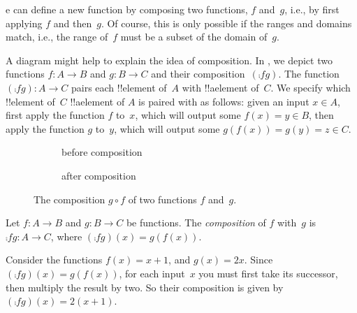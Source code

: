 \documentclass[../../../include/open-logic-section]{subfiles}
\begin{document}

\begin{explain}
e can define a new
function by composing two functions, $f$ and~$g$, i.e., by first
applying $f$ and then~$g$. Of course, this is only possible if the
ranges and domains match, i.e., the range of~$f$ must be a subset of
the domain of~$g$. 

A diagram might help to explain the idea of composition. In
, we depict two functions $f \colon A \to B$
and $g \colon B \to C$ and their composition~$(\comp{f}{g})$. The
function $(\comp{f}{g}) \colon A \to C$ pairs each !!{element} of~$A$
with !!a{element} of~$C$. We specify which !!{element} of~$C$
!!a{element} of $A$ is paired with as follows: given an input $x \in
A$, first apply the function $f$ to~$x$, which will output some $f(x)
= y \in B$, then apply the function $g$ to~$y$, which will output some
$g(f(x)) = g(y) = z \in C$.
\begin{figure}
  \begin{subfigure}{\linewidth}
  	\centering
  	\caption{before composition}
  \end{subfigure}
  \begin{subfigure}{\linewidth}
  	\centering
  	\caption{after composition}
  \end{subfigure}
  \caption{The composition $g \circ f$ of two functions $f$ and~$g$.}
\end{figure}
\end{explain}

\begin{defn}[Composition]
Let $f\colon A \to B$ and $g\colon B \to C$ be functions. The
\emph{composition} of $f$ with~$g$ is $\comp{f}{g} \colon A \to C$,
where $(\comp{f}{g})(x) = g(f(x))$.
\end{defn}

\begin{ex}
Consider the functions $f(x) = x + 1$, and $g(x) = 2x$. Since
$(\comp{f}{g})(x) = g(f(x))$, for each input~$x$ you must first take
its successor, then multiply the result by two. So their composition
is given by $(\comp{f}{g})(x) = 2(x+1)$.
\end{ex}
\end{document}
